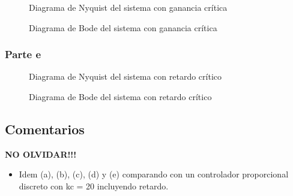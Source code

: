 \begin{figure}[h]
  \centering
  
  \caption{Diagrama de Nyquist del sistema con ganancia crítica}
  \label{fig:nyquist-g2}
\end{figure}

\begin{figure}[h]
  \centering
  
  \caption{Diagrama de Bode del sistema con ganancia crítica}
  \label{fig:bode-g2}
\end{figure}

\subsubsection{Parte e}

\begin{figure}[h]
  \centering
  
  \caption{Diagrama de Nyquist del sistema con retardo crítico}
  \label{fig:nyquist-g3}
\end{figure}

\begin{figure}[h]
  \centering
  
  \caption{Diagrama de Bode del sistema con retardo crítico}
  \label{fig:bode-g3}
\end{figure}

\FloatBarrier
\subsection{Comentarios}

\textbf{NO OLVIDAR!!!}


\begin{itemize}
  \item Idem (a), (b), (c), (d) y (e) comparando con un controlador proporcional discreto con kc = 20 incluyendo retardo.
\end{itemize}

